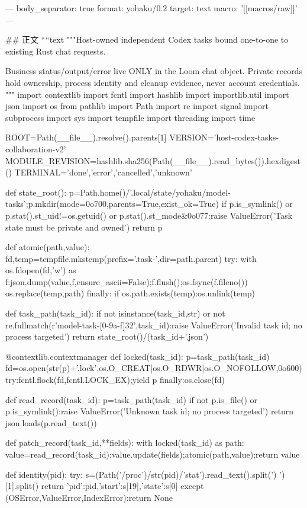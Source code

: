 ---
body_separator: true
format: yohaku/0.2
target: text
macro: '[[macros/raw]]'
---

## 正文
````text
"""Host-owned independent Codex tasks bound one-to-one to existing Rust chat requests.

Business status/output/error live ONLY in the Loom chat object. Private records
hold ownership, process identity and cleanup evidence, never account credentials.
"""
import contextlib
import fcntl
import hashlib
import importlib.util
import json
import os
from pathlib import Path
import re
import signal
import subprocess
import sys
import tempfile
import threading
import time

ROOT=Path(__file__).resolve().parents[1]
VERSION='host-codex-tasks-collaboration-v2'
MODULE_REVISION=hashlib.sha256(Path(__file__).read_bytes()).hexdigest()
TERMINAL={'done','error','cancelled','unknown'}


def state_root():
    p=Path.home()/'.local/state/yohaku/model-tasks';p.mkdir(mode=0o700,parents=True,exist_ok=True)
    if p.is_symlink() or p.stat().st_uid!=os.getuid() or p.stat().st_mode&0o077:raise ValueError('Task state must be private and owned')
    return p


def atomic(path,value):
    fd,temp=tempfile.mkstemp(prefix='.task-',dir=path.parent)
    try:
        with os.fdopen(fd,'w') as f:json.dump(value,f,ensure_ascii=False);f.flush();os.fsync(f.fileno())
        os.replace(temp,path)
    finally:
        if os.path.exists(temp):os.unlink(temp)


def task_path(task_id):
    if not isinstance(task_id,str) or not re.fullmatch(r'model-task-[0-9a-f]{32}',task_id):raise ValueError('Invalid task id; no process targeted')
    return state_root()/(task_id+'.json')


@contextlib.contextmanager
def locked(task_id):
    p=task_path(task_id)
    fd=os.open(str(p)+'.lock',os.O_CREAT|os.O_RDWR|os.O_NOFOLLOW,0o600)
    try:fcntl.flock(fd,fcntl.LOCK_EX);yield p
    finally:os.close(fd)


def read_record(task_id):
    p=task_path(task_id)
    if not p.is_file() or p.is_symlink():raise ValueError('Unknown task id; no process targeted')
    return json.loads(p.read_text())


def patch_record(task_id,**fields):
    with locked(task_id) as path:
        value=read_record(task_id);value.update(fields);atomic(path,value);return value


def identity(pid):
    try:
        s=(Path('/proc')/str(pid)/'stat').read_text().split(') ')[1].split()
        return {'pid':pid,'start':s[19],'state':s[0]}
    except (OSError,ValueError,IndexError):return None


